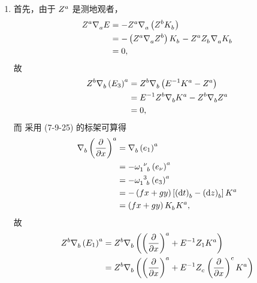 \begin{xiti}
\begin{zm}
\begin{enumerate}[label=(\arabic*)]
				\item 首先，由于 $\tensor{Z}{^a}$ 是测地观者，
				\begin{equation*}
					\begin{split}
						\tensor{Z}{^a} \Nabla{a} E &= - \tensor{Z}{^a} \Nabla{a} \left( \tensor{Z}{^b} \tensor{K}{_b} \right)\\
						&= - \left( \tensor{Z}{^a} \Nabla{a} \tensor{Z}{^b} \right) \tensor{K}{_b} - \tensor{Z}{^a} \tensor{Z}{_b} \Nabla{a} \tensor{K}{_b}\\
						&= 0,
					\end{split}
				\end{equation*}
				故
				\begin{equation*}
					\begin{split}
						\tensor{Z}{^b} \Nabla{b} \tensor{\left( E_3 \right)}{^a} &= \tensor{Z}{^b} \Nabla{b} \left( E^{-1} \tensor{K}{^a} - \tensor{Z}{^a} \right)\\
						&= E^{-1} \tensor{Z}{^b} \Nabla{b} \tensor{K}{^a} - \tensor{Z}{^b} \Nabla{b} \tensor{Z}{^a}\\
						&=0,
					\end{split}
				\end{equation*}
				而 采用 (7-9-25) 的标架可算得
				\begin{equation*}
					\begin{split}
						\Nabla{b} \tensor{\left( \pdv{x} \right)}{^a} &= \Nabla{b} \tensor{\left( e_1 \right)}{^a}\\
						&= - \tensor{\omega}{_1^\nu_b} \tensor{\left( e_\nu \right)}{^a}\\
						&= - \tensor{\omega}{_1^3_b} \tensor{\left( e_3 \right)}{^a}\\
						&= - \left( fx+gy \right) \left[ \tensor{\left( \dd{t} \right)}{_b} - \tensor{\left( \dd{z} \right)}{_b} \right] \tensor{K}{^a}\\
						&= \left( fx+gy \right) \tensor{K}{_b} \tensor{K}{^a},
					\end{split}
				\end{equation*}
				故
				\begin{equation*}
					\begin{split}
						\tensor{Z}{^b} \Nabla{b} \tensor{\left( E_1 \right)}{^a} &= \tensor{Z}{^b} \Nabla{b} \left( \tensor{\left( \pdv{x} \right)}{^a} + E^{-1} Z_1 \tensor{K}{^a} \right)\\
						&= \tensor{Z}{^b} \Nabla{b} \left( \tensor{\left( \pdv{x} \right)}{^a} + E^{-1} \tensor{Z}{_c} \tensor{\left( \pdv{x} \right)}{^c} \tensor{K}{^a} \right)\\

\end{split}
\end{equation*}
\end{enumerate}
\end{zm}
\end{xiti}
